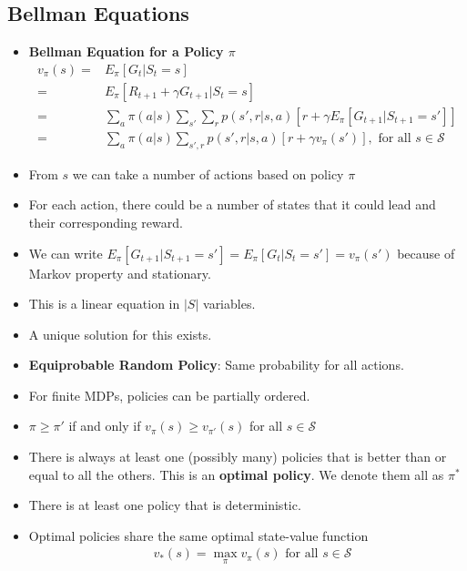 \documentclass[a4paper]{article}
\begin{document}
\subsection{Bellman Equations}
\begin{itemize}
    \item \textbf{Bellman Equation for a Policy $\pi$}
    \begin{equation*}
        \begin{split}
            v_\pi(s)=&E_\pi[G_t|S_t=s]\\
            =&E_\pi[R_{t+1}+\gamma G_{t+1}|S_t=s]\\
            =&\sum_a\pi(a|s)\sum_{s'}\sum_rp(s',r|s,a)[r+\gamma E_\pi[G_{t+1}|S_{t+1}=s']]\\
            =&\sum_a\pi(a|s)\sum_{s',r}p(s',r|s,a)[r+\gamma v_\pi(s')],\text{ for all }s\in \mathcal{S}
        \end{split}
    \end{equation*}
    \item From $s$ we can take a number of actions based on policy $\pi$
    \item For each action, there could be a number of states that it could lead and their corresponding reward.
    \item We can write $E_\pi[G_{t+1}|S_{t+1}=s']=E_\pi[G_t|S_t=s']=v_\pi(s')$ because of Markov property and stationary.
    \item This is a linear equation in $\lvert S\rvert$ variables.
    \item A unique solution for this exists.
    \item \textbf{Equiprobable Random Policy}: Same probability for all actions.
    \item For finite MDPs, policies can be partially ordered.
    \item $\pi \geq \pi'$ if and only if $v_\pi(s)\geq v_{\pi'}(s)$ for all $s\in \mathcal{S}$
    \item There is always at least one (possibly many) policies that is better than or equal to all the others. This is an \textbf{optimal policy}. We denote them all as $\pi^*$
    \item There is at least one policy that is deterministic.
    \item Optimal policies share the same optimal state-value function
    \begin{equation*}
        \begin{split}
            &v_{*}(s)=\max_\pi v_\pi(s)\text{ for all }s\in \mathcal{S}\\

\end{split}
\end{equation*}
\end{itemize}
\end{document}
